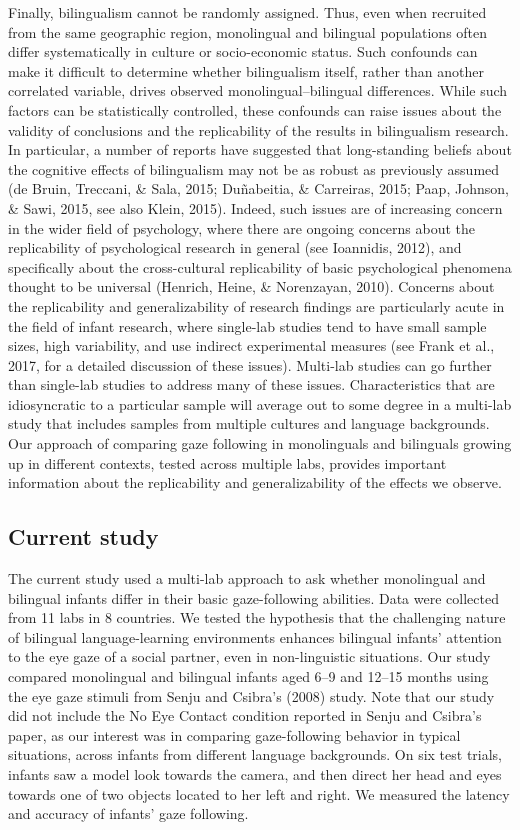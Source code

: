 \documentclass[,man,floatsintext]{apa6}
\begin{document}
Finally, bilingualism cannot be randomly assigned. Thus, even when recruited from the same geographic region, monolingual and bilingual populations often differ systematically in culture or socio-economic status. Such confounds can make it difficult to determine whether bilingualism itself, rather than another correlated variable, drives observed monolingual--bilingual differences. While such factors can be statistically controlled, these confounds can raise issues about the validity of conclusions and the replicability of the results in bilingualism research. In particular, a number of reports have suggested that long-standing beliefs about the cognitive effects of bilingualism may not be as robust as previously assumed (de Bruin, Treccani, \& Sala, 2015; Duñabeitia, \& Carreiras, 2015; Paap, Johnson, \& Sawi, 2015, see also Klein, 2015). Indeed, such issues are of increasing concern in the wider field of psychology, where there are ongoing concerns about the replicability of psychological research in general (see Ioannidis, 2012), and specifically about the cross-cultural replicability of basic psychological phenomena thought to be universal (Henrich, Heine, \& Norenzayan, 2010). Concerns about the replicability and generalizability of research findings are particularly acute in the field of infant research, where single-lab studies tend to have small sample sizes, high variability, and use indirect experimental measures (see Frank et al., 2017, for a detailed discussion of these issues). Multi-lab studies can go further than single-lab studies to address many of these issues. Characteristics that are idiosyncratic to a particular sample will average out to some degree in a multi-lab study that includes samples from multiple cultures and language backgrounds. Our approach of comparing gaze following in monolinguals and bilinguals growing up in different contexts, tested across multiple labs, provides important information about the replicability and generalizability of the effects we observe.

\hypertarget{current-study}{%
\subsection{Current study}\label{current-study}}

The current study used a multi-lab approach to ask whether monolingual and bilingual infants differ in their basic gaze-following abilities. Data were collected from 11 labs in 8 countries. We tested the hypothesis that the challenging nature of bilingual language-learning environments enhances bilingual infants' attention to the eye gaze of a social partner, even in non-linguistic situations. Our study compared monolingual and bilingual infants aged 6--9 and 12--15 months using the eye gaze stimuli from Senju and Csibra's (2008) study. Note that our study did not include the No Eye Contact condition reported in Senju and Csibra's paper, as our interest was in comparing gaze-following behavior in typical situations, across infants from different language backgrounds. On six test trials, infants saw a model look towards the camera, and then direct her head and eyes towards one of two objects located to her left and right. We measured the latency and accuracy of infants' gaze following.
\end{document}

